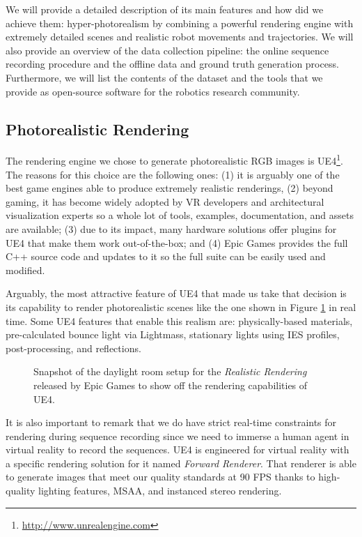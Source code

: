 We will provide a detailed description of its main features and how did we achieve them: hyper-photorealism by combining a powerful rendering engine with extremely detailed scenes and realistic robot movements and trajectories. We will also provide an overview of the data collection pipeline: the online sequence recording procedure and the offline data and ground truth generation process. Furthermore, we will list the contents of the dataset and the tools that we provide as open-source software for the robotics research community.

\subsection{Photorealistic Rendering}

The rendering engine we chose to generate photorealistic RGB images is \acf{UE4}\footnote{\url{http://www.unrealengine.com}}. The reasons for this choice are the following ones: (1) it is arguably one of the best game engines able to produce extremely realistic renderings, (2) beyond gaming, it has become widely adopted by VR developers and architectural visualization experts so a whole lot of tools, examples, documentation, and assets are available; (3) due to its impact, many hardware solutions offer plugins for \ac{UE4} that make them work out-of-the-box; and (4) Epic Games provides the full C++ source code and updates to it so the full suite can be easily used and modified.

Arguably, the most attractive feature of \ac{UE4} that made us take that decision is its capability to render photorealistic scenes like the one shown in Figure \ref{fig:realistic_rendering} in real time. Some \ac{UE4} features that enable this realism are: physically-based materials, pre-calculated bounce light via Lightmass, stationary lights using IES profiles, post-processing, and reflections.

\begin{figure}[!hbt]
  \centering
  \caption{Snapshot of the daylight room setup for the \emph{Realistic Rendering} released by Epic Games to show off the rendering capabilities of \ac{UE4}.}
  \label{fig:realistic_rendering}
\end{figure}

It is also important to remark that we do have strict real-time constraints for rendering during sequence recording since we need to immerse a human agent in virtual reality to record the sequences. \ac{UE4} is engineered for virtual reality with a specific rendering solution for it named \emph{Forward Renderer}. That renderer is able to generate images that meet our quality standards at 90 \ac{FPS} thanks to high-quality lighting features, \ac{MSAA}, and instanced stereo rendering.

